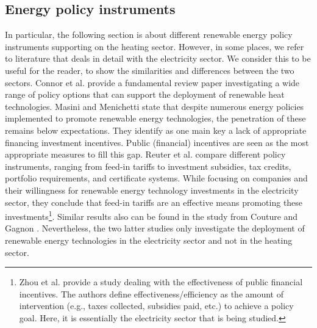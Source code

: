 \subsection{Energy policy instruments}\label{aspect3}
In particular, the following section is about different renewable energy policy instruments supporting on the heating sector. However, in some places, we refer to literature that deals in detail with the electricity sector. We consider this to be useful for the reader, to show the similarities and differences between the two sectors. Connor et al. \cite{connor2013devising} provide a fundamental review paper investigating a wide range of policy options that can support the deployment of renewable heat technologies. Masini and Menichetti \cite{masini2012impact} state that despite numerous energy policies implemented to promote renewable energy technologies, the penetration of these remains below expectations. They identify as one main key a lack of appropriate financing investment incentives. Public (financial) incentives are seen as the most appropriate measures to fill this gap. Reuter et al. \cite{reuter2012renewable} compare different policy instruments, ranging from feed-in tariffs to investment subsidies, tax credits, portfolio requirements, and certificate systems. While focusing on companies and their willingness for renewable energy technology investments in the electricity sector, they conclude that feed-in tariffs are an effective means promoting these investments\footnote{Zhou et al. \cite{zhou2011designing} provide a study dealing with the effectiveness of public financial incentives. The authors define effectiveness/efficiency as the amount of intervention (e.g., taxes collected, subsidies paid, etc.) to achieve a policy goal. Here, it is essentially the electricity sector that is being studied.}. Similar results also can be found in the study from Couture and Gagnon \cite{couture2010analysis}. Nevertheless, the two latter studies only investigate the deployment of renewable energy technologies in the electricity sector and not in the heating sector.\vspace{0.5cm} 

